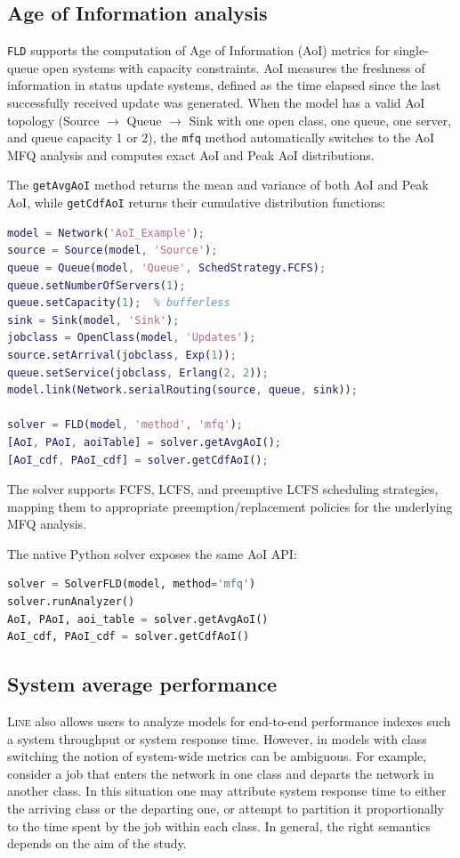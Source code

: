 \subsection{Age of Information analysis}
\texttt{FLD} supports the computation of Age of Information (AoI) metrics for single-queue open systems with capacity constraints. AoI measures the freshness of information in status update systems, defined as the time elapsed since the last successfully received update was generated. When the model has a valid AoI topology (Source $\to$ Queue $\to$ Sink with one open class, one queue, one server, and queue capacity 1 or 2), the \texttt{mfq} method automatically switches to the AoI MFQ analysis and computes exact AoI and Peak AoI distributions.
\begin{MATLAB}
The \texttt{getAvgAoI} method returns the mean and variance of both AoI and Peak AoI, while \texttt{getCdfAoI} returns their cumulative distribution functions:
\begin{lstlisting}[language = matlab]
model = Network('AoI_Example');
source = Source(model, 'Source');
queue = Queue(model, 'Queue', SchedStrategy.FCFS);
queue.setNumberOfServers(1);
queue.setCapacity(1);  % bufferless
sink = Sink(model, 'Sink');
jobclass = OpenClass(model, 'Updates');
source.setArrival(jobclass, Exp(1));
queue.setService(jobclass, Erlang(2, 2));
model.link(Network.serialRouting(source, queue, sink));

solver = FLD(model, 'method', 'mfq');
[AoI, PAoI, aoiTable] = solver.getAvgAoI();
[AoI_cdf, PAoI_cdf] = solver.getCdfAoI();
\end{lstlisting}
The solver supports FCFS, LCFS, and preemptive LCFS scheduling strategies, mapping them to appropriate preemption/replacement policies for the underlying MFQ analysis.
\end{MATLAB}
\begin{PYTHON}
The native Python solver exposes the same AoI API:
\begin{lstlisting}[language=python]
solver = SolverFLD(model, method='mfq')
solver.runAnalyzer()
AoI, PAoI, aoi_table = solver.getAvgAoI()
AoI_cdf, PAoI_cdf = solver.getCdfAoI()
\end{lstlisting}
\end{PYTHON}

\subsection{System average performance}
\textsc{Line} also allows users to analyze models for end-to-end performance indexes such a system throughput or system response time. However, in models with class switching the notion of system-wide metrics can be ambiguous. For example, consider a job that enters the network in one class and departs the network in another class. In this situation one may attribute system response time to either the arriving class or the departing one, or attempt to partition it proportionally to the time spent by the job within each class. In general, the right semantics depends on the aim of the study.

